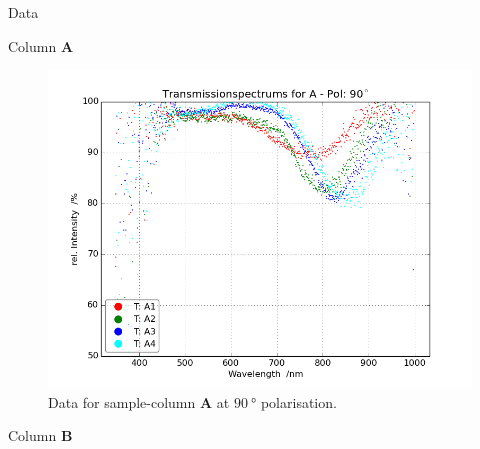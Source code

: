 \begin{appendix}
\begin{chapter}{Data}
\begin{section}{Column \textbf{A}}
\begin{figure}[ht!]
\begin{minipage}{.92\textwidth}
          \includegraphics[width=\textwidth]{Figures/TransspecRAW_APol90.png}
          \caption{Data for sample-column \textbf{A} at $\SI{90}{\degree}$
              polarisation.}
          \label{fig:TransspecRAW_APol90}
        \end{minipage}
      \end{figure}
      
    \end{section}
    
    
    
    \newpage
    \begin{section}{Column \textbf{B}}
      \label{Appendix:DataB}
      

\end{section}
\end{chapter}
\end{appendix}

